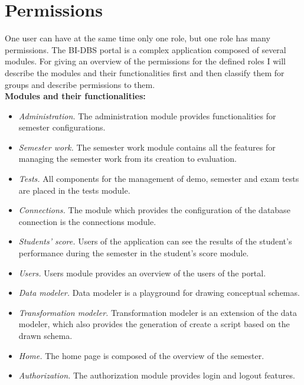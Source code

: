 \section{Permissions} One user can have at the same time only one role, but one role has many permissions. The BI-DBS portal is a complex application composed of several modules. For giving an overview of the permissions for the defined roles I will describe the modules and their functionalities first and then classify them for groups and describe permissions to them.\\

\noindent \textbf{Modules and their functionalities:}

\begin{itemize}
    \item \emph{Administration.} The administration module provides functionalities for semester configurations. 
    \item \emph{Semester work.} The semester work module contains all the features for managing the semester work from its creation to evaluation.
    \item \emph{Tests.} All components for the management of demo, semester and exam tests are placed in the tests module.
    \item \emph{Connections.} The module which provides the configuration of the database connection is the connections module.
    \item \emph{Students' score.} Users of the application can see the results of the student's performance during the semester in the student's score module.
    \item \emph{Users.} Users module provides an overview of the users of the portal.
    \item \emph{Data modeler.} Data modeler is a playground for drawing conceptual schemas.
    \item \emph{Transformation modeler.} Transformation modeler is an extension of the data modeler, which also provides the generation of create a script based on the drawn schema.
    \item \emph{Home.} The home page is composed of the overview of the semester.
    \item \emph{Authorization.} The authorization module provides login and logout features.

\end{itemize}

\vspace{0.4cm}

